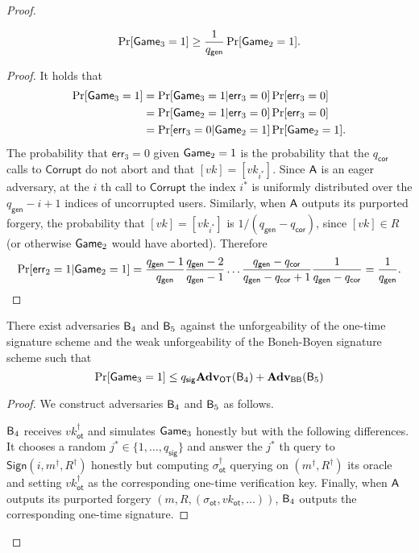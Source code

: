 \begin{proof}
\begin{lemma}
$$
\Pr[\mathsf{Game}_3=1]\geq \frac{1}{{q_\mathsf{gen}}}\Pr[\mathsf{Game}_2=1].
$$
\end{lemma}
\begin{proof}
It holds that
\begin{align*}
\Pr[\mathsf{Game}_3=1] &= \Pr[\mathsf{Game}_3=1|\mathsf{err}_3=0]\Pr[\mathsf{err}_3=0]\\
&=\Pr[\mathsf{Game}_2=1|\mathsf{err}_3=0]\Pr[\mathsf{err}_3=0]\\
&=\Pr[\mathsf{err}_3=0|\mathsf{Game}_2=1]\Pr[\mathsf{Game}_2=1].
\end{align*}
The probability that $\mathsf{err}_3=0$ given $\mathsf{Game}_2=1$ is the probability that the ${q_\mathsf{cor}}$ calls to $\mathsf{Corrupt}$ do not abort and that $[vk]=[vk_{i^*}]$. Since $\mathsf{A}$ is an eager adversary, at the $i$ th call to $\mathsf{Corrupt}$ the index $i^*$ is uniformly distributed over the ${q_\mathsf{gen}}-i+1$ indices of uncorrupted users. Similarly, when $\mathsf{A}$ outputs its purported forgery, the probability that $[vk]=[vk_{i^*}]$ is $1/({q_\mathsf{gen}}-{q_\mathsf{cor}})$, since $[vk]\in R$ (or otherwise $\mathsf{Game}_2$ would have aborted). Therefore
$$
\Pr[\mathsf{err}_2=1|\mathsf{Game}_2=1]=\frac{{q_\mathsf{gen}}-1}{{q_\mathsf{gen}}}\frac{{q_\mathsf{gen}}-2}{{q_\mathsf{gen}}-1}\ldots\frac{{q_\mathsf{gen}}-{q_\mathsf{cor}}}{{q_\mathsf{gen}}-{q_\mathsf{cor}}+1}\frac{1}{{q_\mathsf{gen}}-{q_\mathsf{cor}}}=\frac{1}{{q_\mathsf{gen}}}.
$$ 
\end{proof}

\begin{lemma}  There exist adversaries $\mathsf{B}_4$ and $\mathsf{B}_5$ against the unforgeability of the one-time signature scheme and the weak unforgeability of the Boneh-Boyen signature scheme such that
$$
\Pr[\mathsf{Game}_3=1]\leq q_\mathsf{sig}\mathbf{Adv}_{\mathsf{OT}}(\mathsf{B}_4)+\mathbf{Adv}_{\mathsf{BB}}(\mathsf{B}_5)
$$
\end{lemma}
\begin{proof}
We construct adversaries $\mathsf{B}_4$ and $\mathsf{B}_5$ as follows.

$\mathsf{B}_4$ receives $vk_\mathsf{ot}^\dag$ and simulates $\mathsf{Game}_3$ honestly but with the following differences. It chooses a random $j^*\in\{1,\ldots, q_\mathsf{sig}\}$ and answer the $j^*$ th query to $\mathsf{Sign}(i,m^\dag,R^\dag)$ honestly but computing $\sigma_\mathsf{ot}^\dag$ querying on $(m^\dag,R^\dag)$ its oracle and setting $vk_\mathsf{ot}^\dag$ as the corresponding one-time verification key. Finally, when $\mathsf{A}$ outputs its purported forgery $(m,R,(\sigma_\mathsf{ot},vk_\mathsf{ot},\ldots))$, $\mathsf{B}_4$ outputs the corresponding one-time signature.


\end{proof}
\end{proof}
